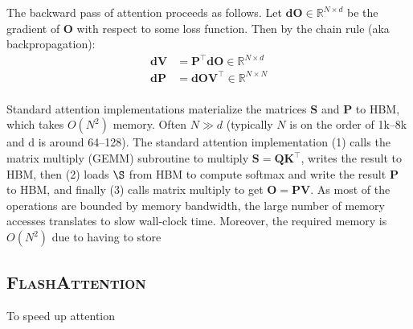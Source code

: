\message{ !name(../flash2.tex)}\documentclass{article}
\newcommand{\vQ}{\mathbf{Q}}
\newcommand{\vK}{\mathbf{K}}
\newcommand{\vV}{\mathbf{V}}
\newcommand{\vdV}{\mathbf{dV}}
\newcommand{\vS}{\mathbf{S}}
\newcommand{\vP}{\mathbf{P}}
\newcommand{\vdP}{\mathbf{dP}}
\newcommand{\vO}{\mathbf{O}}
\newcommand{\vdO}{\mathbf{dO}}
\newcommand{\sysnameone}{\textsc{FlashAttention}\xspace}
\begin{document}
The backward pass of attention proceeds as follows.
Let $\vdO \in \mathbb{R}^{N \times d}$ be the gradient of $\vO$ with respect to some loss
function. Then by the chain rule (aka backpropagation):
\begin{align*}
  \vdV &= \vP^\top \vdO \in \mathbb{R}^{N \times d} \\
  \vdP &= \vdO \vV^\top \in \mathbb{R}^{N \times N} \\
\end{align*}

Standard attention implementations materialize the matrices $\vS$ and $\vP$ to
HBM, which takes $O(N^2)$ memory.
Often $N \gg d$ (typically $N$ is on the order of 1k--8k and d is around 64--128).
The standard attention implementation (1) calls the matrix multiply (GEMM)
subroutine to multiply $\vS = \vQ \vK^\top$, writes the result to HBM, then (2) loads
$\S$ from HBM to compute softmax and write the result $\vP$ to HBM, and finally
(3) calls matrix multiply to get $\vO = \vP \vV$.
As most of the operations are bounded by memory bandwidth, the large number of
memory accesses translates to slow wall-clock time.
Moreover, the required memory is $O(N^2)$ due to having to store

\subsection{\sysnameone}
\label{subsec:flashv1}

To speed up attention


\end{document}
